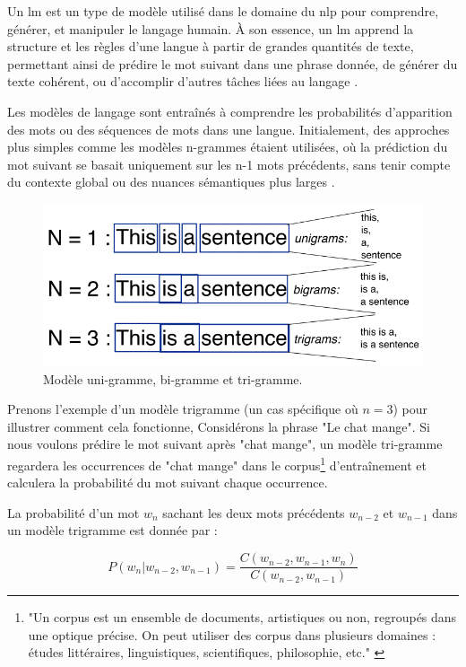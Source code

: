 Un \ac{lm}  est un type de modèle utilisé dans le domaine du \ac{nlp} pour comprendre, générer, et manipuler le langage humain. À son essence, un \ac{lm} apprend la structure et les règles d'une langue à partir de grandes quantités de texte, permettant ainsi de prédire le mot suivant dans une phrase donnée, de générer du texte cohérent, ou d'accomplir d'autres tâches liées au langage \cite{Jurafsky2009}. 

Les modèles de langage sont entraînés à comprendre les probabilités d'apparition des mots ou des séquences de mots dans une langue. Initialement, des approches plus simples comme les modèles n-grammes étaient utilisées, où la prédiction du mot suivant se basait uniquement sur les n-1 mots précédents, sans tenir compte du contexte global ou des nuances sémantiques plus larges \cite{Jurafsky2009, Agarwal}.

\begin{figure}[H]
    \centering
    \includegraphics[width=12cm]{gfx/fig-n-gram.png}
    \caption{Modèle uni-gramme, bi-gramme et tri-gramme. \cite{Agarwal}}
    \label{fig:n-gram}
\end{figure}

Prenons l'exemple d'un modèle trigramme (un cas spécifique où $n = 3$) pour illustrer comment cela fonctionne, Considérons la phrase "Le chat mange". Si nous voulons prédire le mot suivant après "chat mange", un modèle tri-gramme regardera les occurrences de "chat mange" dans le corpus\footnote{"Un corpus est un ensemble de documents, artistiques ou non, regroupés dans une optique précise. On peut utiliser des corpus dans plusieurs domaines : études littéraires, linguistiques, scientifiques, philosophie, etc." \cite{frwiki:205358830}} d'entraînement et calculera la probabilité du mot suivant chaque occurrence.

La probabilité d'un mot \(w_n\) sachant les deux mots précédents \(w_{n-2}\) et \(w_{n-1}\) dans un modèle trigramme est donnée par : 

\begin{equation}
    P(w_n | w_{n-2}, w_{n-1}) = \frac{C(w_{n-2}, w_{n-1}, w_n)}{C(w_{n-2}, w_{n-1})}
\end{equation}

